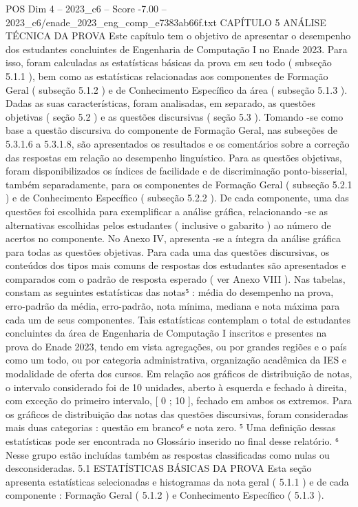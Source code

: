 \begin{textsample}{POS Dim 4 – 2023\_c6 – Score -7.00 – 2023\_c6/enade\_2023\_eng\_comp\_e7383ab66f.txt}  \label{ex:f4_pos_339}
CAPÍTULO 5 ANÁLISE TÉCNICA DA PROVA Este capítulo tem o objetivo de apresentar o desempenho dos estudantes concluintes de Engenharia de Computação I no Enade 2023.
Para isso, foram calculadas as estatísticas básicas da prova em seu todo ( subseção 5.1.1 ), bem como as estatísticas relacionadas aos componentes de Formação Geral ( subseção 5.1.2 ) e de Conhecimento Específico da área ( subseção 5.1.3 ).
Dadas as suas características, foram analisadas, em separado, as questões objetivas ( seção 5.2 ) e as questões discursivas ( seção 5.3 ).
Tomando -se como base a questão discursiva do componente de Formação Geral, nas subseções de 5.3.1.6 a 5.3.1.8, são apresentados os resultados e os comentários sobre a correção das respostas em relação ao desempenho linguístico.
Para as questões objetivas, foram disponibilizados os índices de facilidade e de discriminação ponto-bisserial, também separadamente, para os componentes de Formação Geral ( subseção 5.2.1 ) e de Conhecimento Específico ( subseção 5.2.2 ).
De cada componente, uma das questões foi escolhida para exemplificar a análise gráfica, relacionando -se as alternativas escolhidas pelos estudantes ( inclusive o gabarito ) ao número de acertos no componente.
No Anexo IV, apresenta -se a íntegra da análise gráfica para todas as questões objetivas.
Para cada uma das questões discursivas, os conteúdos dos tipos mais comuns de respostas dos estudantes são apresentados e comparados com o padrão de resposta esperado ( ver Anexo VIII ).
Nas tabelas, constam as seguintes estatísticas das notas⁵ : média do desempenho na prova, erro-padrão da média, erro-padrão, nota mínima, mediana e nota máxima para cada um de seus componentes.
Tais estatísticas contemplam o total de estudantes concluintes da área de Engenharia de Computação I inscritos e presentes na prova do Enade 2023, tendo em vista agregações, ou por grandes regiões e o país como um todo, ou por categoria administrativa, organização acadêmica da IES e modalidade de oferta dos cursos.
Em relação aos gráficos de distribuição de notas, o intervalo considerado foi de 10 unidades, aberto à esquerda e fechado à direita, com exceção do primeiro intervalo, [ 0 ; 10 ], fechado em ambos os extremos.
Para os gráficos de distribuição das notas das questões discursivas, foram consideradas mais duas categorias : questão em branco⁶ e nota zero. ⁵ Uma definição dessas estatísticas pode ser encontrada no Glossário inserido no final desse relatório. ⁶ Nesse grupo estão incluídas também as respostas classificadas como nulas ou desconsideradas. 5.1 ESTATÍSTICAS BÁSICAS DA PROVA Esta seção apresenta estatísticas selecionadas e histogramas da nota geral ( 5.1.1 ) e de cada componente : Formação Geral ( 5.1.2 ) e Conhecimento Específico ( 5.1.3 ).

\end{textsample}
